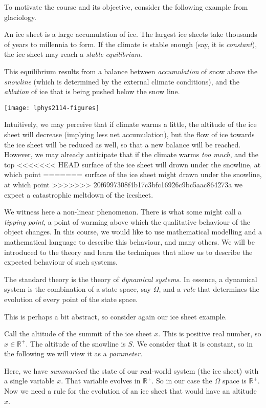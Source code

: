 To motivate the course and its objective, consider the following example
from glaciology.

An ice sheet is a large accumulation of ice. The largest ice sheets take
thousands of years to millennia to form. If the climate is stable enough
(say, it is \emph{constant}), the ice sheet may reach a \emph{stable}
\emph{equilibrium}.

This equilibrium results from a balance between \emph{accumulation} of
snow above the \emph{snowline} (which is determined by the external
climate conditions), and the \emph{ablation} of ice that is being pushed
below the snow line.

\texttt{[image: lphys2114-figures]}

Intuitively, we may perceive that if climate warms a little, the
altitude of the ice sheet will decrease (implying less net
accumulation), but the flow of ice towards the ice sheet will be reduced
as well, so that a new balance will be reached. However, we may already
anticipate that if the climate warms \emph{too much}, and the top
<<<<<<< HEAD
surface of the ice sheet will drown under the snowline, at which point
=======
surface of the ice sheet might drawn under the snowline, at which point
>>>>>>> 20f6997308f4b17c3bfc16926c9bc5aac864273a
we expect a catastrophic meltdown of the icesheet.

We witness here a non-linear phenomenon. There is what some might call a
\emph{tipping point}, a point of warming above which the qualitative
behaviour of the object changes. In this course, we would like to use
mathematical modelling and a mathematical language to describe this
behaviour, and many others. We will be introduced to the theory and
learn the techniques that allow us to describe the expected behaviour of
such systems.

The standard theory is the theory of \emph{dynamical systems}. In
essence, a dynamical system is the combination of a state space, say
\(\Omega\), and a \emph{rule} that determines the evolution of every
point of the state space.

This is perhaps a bit abstract, so consider again our ice sheet example.

Call the altitude of the summit of the ice sheet \(x\). This is positive
real number, so \(x \in \mathbb{R}^+\). The altitude of the snowline is
\(S\). We consider that it is constant, so in the following we will view
it as a \emph{parameter}.

Here, we have \emph{summarised} the state of our real-world system (the
ice sheet) with a single variable \(x\). That variable evolves in
\(\mathbb{R}^+\). So in our case the \(\Omega\) space is
\(\mathbb{R}^+\). Now we need a rule for the evolution of an ice sheet
that would have an altitude \(x\).

